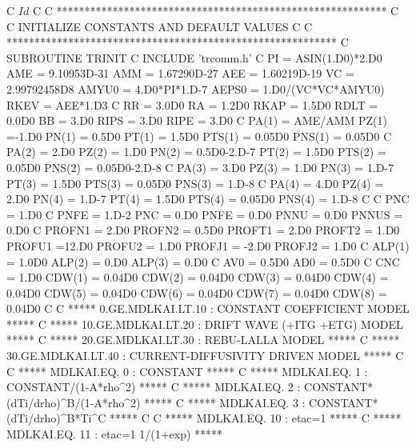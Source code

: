 C     $Id$
C
C     ***********************************************************
C
C           INITIALIZE CONSTANTS AND DEFAULT VALUES
C
C     ***********************************************************
C
      SUBROUTINE TRINIT
C
      INCLUDE 'trcomm.h'
C
      PI      = ASIN(1.D0)*2.D0
      AME     = 9.10953D-31
      AMM     = 1.67290D-27
      AEE     = 1.60219D-19
      VC      = 2.99792458D8
      AMYU0   = 4.D0*PI*1.D-7
      AEPS0   = 1.D0/(VC*VC*AMYU0)
      RKEV    = AEE*1.D3
C
      RR      = 3.0D0     
      RA      = 1.2D0      
      RKAP    = 1.5D0
      RDLT    = 0.0D0
      BB      = 3.D0        
      RIPS    = 3.D0         
      RIPE    = 3.D0         
C
      PA(1)   = AME/AMM
      PZ(1)   =-1.D0
      PN(1)   = 0.5D0
      PT(1)   = 1.5D0
      PTS(1)  = 0.05D0
      PNS(1)  = 0.05D0
C
      PA(2)   = 2.D0
      PZ(2)   = 1.D0
      PN(2)   = 0.5D0-2.D-7
      PT(2)   = 1.5D0
      PTS(2)  = 0.05D0
      PNS(2)  = 0.05D0-2.D-8
C
      PA(3)   = 3.D0
      PZ(3)   = 1.D0
      PN(3)   = 1.D-7
      PT(3)   = 1.5D0
      PTS(3)  = 0.05D0
      PNS(3)  = 1.D-8
C
      PA(4)   = 4.D0
      PZ(4)   = 2.D0
      PN(4)   = 1.D-7
      PT(4)   = 1.5D0
      PTS(4)  = 0.05D0
      PNS(4)  = 1.D-8
C
C      PNC     = 1.D0
C      PNFE    = 1.D-2
      PNC     = 0.D0
      PNFE    = 0.D0
      PNNU    = 0.D0
      PNNUS   = 0.D0
C
      PROFN1 = 2.D0
      PROFN2 = 0.5D0
      PROFT1 = 2.D0
      PROFT2 = 1.D0
      PROFU1 =12.D0
      PROFU2 = 1.D0
      PROFJ1 = -2.D0
      PROFJ2 = 1.D0
C
      ALP(1) = 1.0D0
      ALP(2) = 0.D0
      ALP(3) = 0.D0
C
      AV0    = 0.5D0
      AD0    = 0.5D0
C
      CNC    = 1.D0
      CDW(1) = 0.04D0
      CDW(2) = 0.04D0
      CDW(3) = 0.04D0
      CDW(4) = 0.04D0
      CDW(5) = 0.04D0
      CDW(6) = 0.04D0
      CDW(7) = 0.04D0
      CDW(8) = 0.04D0
C
C        *****  0.GE.MDLKAI.LT.10 : CONSTANT COEFFICIENT MODEL *****
C        ***** 10.GE.MDLKAI.LT.20 : DRIFT WAVE (+ITG +ETG) MODEL *****
C        ***** 20.GE.MDLKAI.LT.30 : REBU-LALLA MODEL *****
C        ***** 30.GE.MDLKAI.LT.40 : CURRENT-DIFFUSIVITY DRIVEN MODEL *****
C                                                                  
C           *****  MDLKAI.EQ. 0   : CONSTANT *****
C           *****  MDLKAI.EQ. 1   : CONSTANT/(1-A*rho^2) *****
C           *****  MDLKAI.EQ. 2   : CONSTANT*(dTi/drho)^B/(1-A*rho^2) *****
C           *****  MDLKAI.EQ. 3   : CONSTANT*(dTi/drho)^B*Ti^C *****
C                                                                  
C           *****  MDLKAI.EQ. 10  : etac=1 *****
C           *****  MDLKAI.EQ. 11  : etac=1 1/(1+exp) *****

